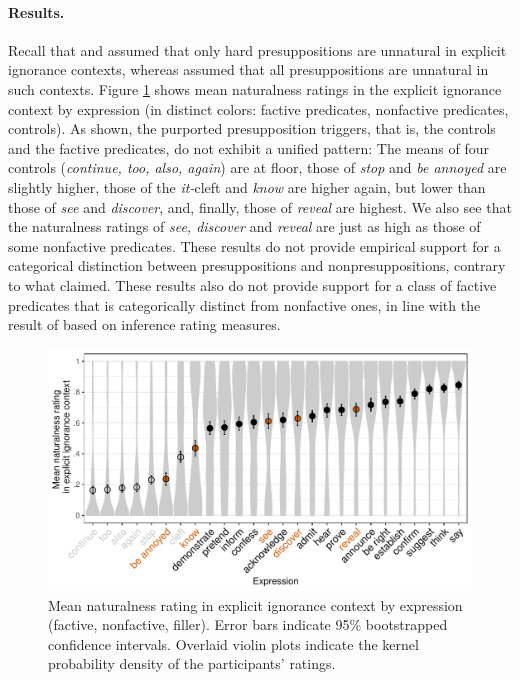 \documentclass[11pt,fleqn]{article}
\newcommand{\6}{\mbox{$[\hspace*{-.6mm}[$}}
\newcommand{\9}{\mbox{$]\hspace*{-.6mm}]$}}
\begin{document}
\paragraph{Results.} Recall that \citealt{simons01} and \citealt{abusch10} assumed that only hard presuppositions are unnatural in explicit ignorance contexts, whereas \citealt{mandelkern-etal2020} assumed that all presuppositions are unnatural in such contexts. Figure \ref{fig:acc-by-expression} shows mean naturalness ratings in the explicit ignorance context by expression (in distinct colors: \color{orange}factive predicates\color{black}, \color{green}nonfactive predicates\color{black},  controls). As shown, the purported presupposition triggers, that is, the controls and the factive predicates, do not exhibit a unified pattern: The means of four controls ({\em continue, too, also, again}) are at floor, those of {\em stop} and {\em be annoyed} are slightly higher, those of the {\em it-}cleft and {\em know} are higher again, but lower than those of {\em see} and {\em discover}, and, finally, those of {\em reveal} are highest. We also see that the naturalness ratings of {\em see, discover} and {\em reveal} are just as high as those of some nonfactive predicates. These results do not provide empirical support for a categorical distinction between presuppositions and nonpresuppositions, contrary to what \citealt{mandelkern-etal2020} claimed. These results also do not provide support for a class of factive predicates that is categorically distinct from nonfactive ones, in line with the result of \citealt{degen-tonhauser-language} based on inference rating measures. 

\begin{figure}[h!]
\centering
\includegraphics[width=.9\textwidth]{../../results/main/graphs/explicit-ignorance-naturalness-by-predicate}
\caption{Mean naturalness rating in explicit ignorance context by expression (\color{orange}factive\color{black}, \color{green}nonfactive\color{green}, \color{black}filler\color{black}). Error bars indicate 95\% bootstrapped confidence intervals. Overlaid violin plots indicate the kernel probability density of the participants' ratings.}\label{fig:acc-by-expression}
\end{figure}
\end{document}
